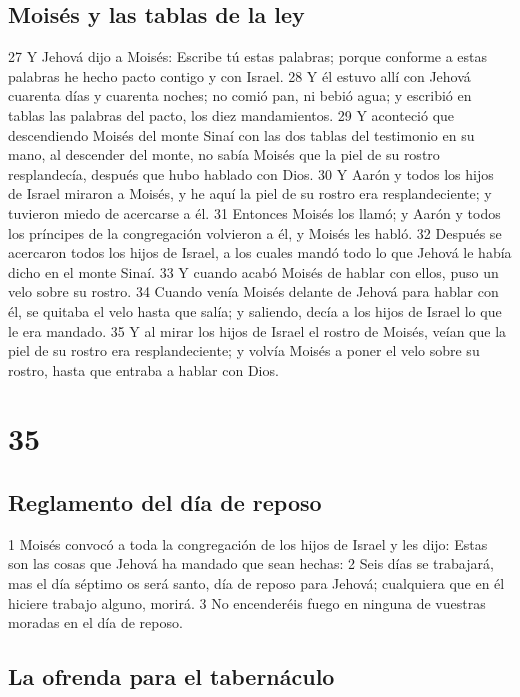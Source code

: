 \section*{Moisés y las tablas de la ley}

27 Y Jehová dijo a Moisés: Escribe tú estas palabras; porque conforme a estas palabras he hecho pacto contigo y con Israel.
28 Y él estuvo allí con Jehová cuarenta días y cuarenta noches; no comió pan, ni bebió agua; y escribió en tablas las palabras del pacto, los diez mandamientos.
29 Y aconteció que descendiendo Moisés del monte Sinaí con las dos tablas del testimonio en su mano, al descender del monte, no sabía Moisés que la piel de su rostro resplandecía, después que hubo hablado con Dios.
30 Y Aarón y todos los hijos de Israel miraron a Moisés, y he aquí la piel de su rostro era resplandeciente; y tuvieron miedo de acercarse a él.
31 Entonces Moisés los llamó; y Aarón y todos los príncipes de la congregación volvieron a él, y Moisés les habló.
32 Después se acercaron todos los hijos de Israel, a los cuales mandó todo lo que Jehová le había dicho en el monte Sinaí.
33 Y cuando acabó Moisés de hablar con ellos, puso un velo sobre su rostro.
34 Cuando venía Moisés delante de Jehová para hablar con él, se quitaba el velo hasta que salía; y saliendo, decía a los hijos de Israel lo que le era mandado.
35 Y al mirar los hijos de Israel el rostro de Moisés, veían que la piel de su rostro era resplandeciente; y volvía Moisés a poner el velo sobre su rostro, hasta que entraba a hablar con Dios.

\chapter{35}

\section*{Reglamento del día de reposo}

1 Moisés convocó a toda la congregación de los hijos de Israel y les dijo: Estas son las cosas que Jehová ha mandado que sean hechas:
2 Seis días se trabajará, mas el día séptimo os será santo, día de reposo para Jehová; cualquiera que en él hiciere trabajo alguno, morirá.
3 No encenderéis fuego en ninguna de vuestras moradas en el día de reposo.

\section*{La ofrenda para el tabernáculo}

